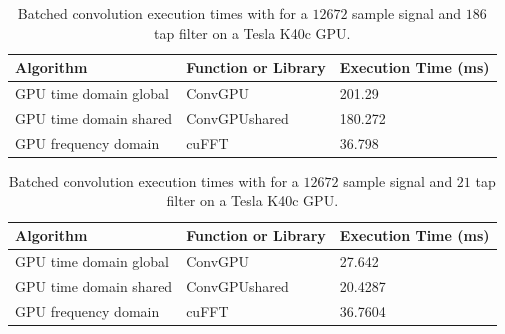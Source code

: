 \begin{table}
\caption{Batched convolution execution times with for a $12672$ sample signal and $186$ tap filter on a Tesla K40c GPU.}
\begin{center}
\begin{tabular}{lll}
	\toprule
	Algorithm 				& Function or Library		& Execution Time (ms) \\ \midrule
	GPU time domain global 	& ConvGPU 					& 201.29		\\
	GPU time domain shared 	& ConvGPUshared 			& 180.272		\\
	GPU frequency domain 	& cuFFT						& 36.798 		\\ 
	\bottomrule
\end{tabular}
\end{center}
\label{tab:Batched_CPUvsGPUtable_12672_186}
\end{table}
\begin{table}
\caption{Batched convolution execution times with for a $12672$ sample signal and $21$ tap filter on a Tesla K40c GPU.}
\begin{center}
\begin{tabular}{lll}
	\toprule
	Algorithm 				& Function or Library		& Execution Time (ms) \\ \midrule
	GPU time domain global 	& ConvGPU 					& 27.642		\\
	GPU time domain shared 	& ConvGPUshared 			& 20.4287		\\
	GPU frequency domain 	& cuFFT						& 36.7604		\\ 
	\bottomrule
\end{tabular}
\end{center}
\label{tab:Batched_CPUvsGPUtable_12672_21}
\end{table}

